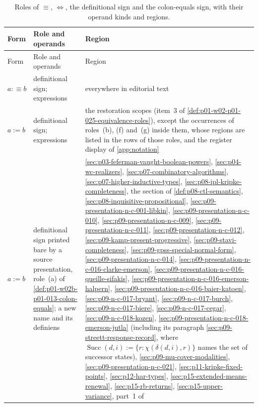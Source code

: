 \begingroup\small
\begin{longtable}{@{}p{}p{}p{}@{}}
\caption{Roles of \(\equiv\), \(\Leftrightarrow\), the definitional sign and
the colon-equals sign, with their operand kinds and regions.}
\label{tab:p01-w02b-p01-013-roles}\\
\toprule
Form & Role and operands & Region \\
\midrule
\endfirsthead
\toprule
Form & Role and operands & Region \\
\midrule
\endhead
\(a\mathrel{:\equiv}b\) & definitional sign; expressions & everywhere in
editorial text \\
\(a\mathrel{:=}b\) & definitional sign; expressions & the restoration
scopes (item~3 of \cref{def:p01-w02-p01-025-equivalence-roles}), except
the occurrences of roles~(b), (f) and~(g) inside them, whose regions are
listed in the rows of those roles, and the register display of
\cref{app:notation} \\
\(a:=b\) & definitional sign printed bare by a source presentation,
role~(a) of \cref{def:p01-w02b-p01-013-colon-equals}; a new name and its
definiens &
\cref{sec:p03-feferman-vaught-boolean-powers}, \cref{sec:p04-wc-realizers},
\cref{sec:p07-combinatory-algorithms}, \cref{sec:p07-higher-inductive-types},
\cref{sec:p08-ipl-kripke-completeness}, the section of
\cref{def:p08-ctl-semantics}, \cref{sec:p08-inquisitive-propositional},
\cref{sec:p09-presentation-n-c-001-libkin},
\cref{sec:p09-presentation-n-c-010}, \cref{sec:p09-presentation-n-c-009},
\cref{sec:p09-presentation-n-c-011}, \cref{sec:p09-presentation-n-c-012},
\cref{sec:p09-kamp-present-progressive}, \cref{sec:p09-stavi-completeness},
\cref{sec:p09-gpss-special-normal-form}, \cref{sec:p09-presentation-n-c-014},
\cref{sec:p09-presentation-n-c-016-clarke-emerson},
\cref{sec:p09-presentation-n-c-016-queille-sifakis},
\cref{sec:p09-presentation-n-c-016-emerson-halpern},
\cref{sec:p09-presentation-n-c-016-baier-katoen},
\cref{sec:p09-n-c-017-bryant}, \cref{sec:p09-n-c-017-burch},
\cref{sec:p09-n-c-017-biere}, \cref{sec:p09-n-c-017-cegar},
\cref{sec:p09-n-c-018-kozen},
\cref{sec:p09-presentation-n-c-018-emerson-jutla} (including its paragraph
\cref{sec:p09-streett-response-record}, where
\(\operatorname{Succ}(d,i):=\{r:\chi(\delta(d,i),r)\}\) names the set of
successor states),
\cref{sec:p09-mu-cover-modalities}, \cref{sec:p09-presentation-n-c-021},
\cref{sec:p11-kripke-fixed-points}, \cref{sec:p12-har-types},
\cref{sec:p15-extended-means-renewal}, \cref{sec:p15-rb-returns},
\cref{sec:p15-upper-variance}, part~1 of

\end{longtable}
